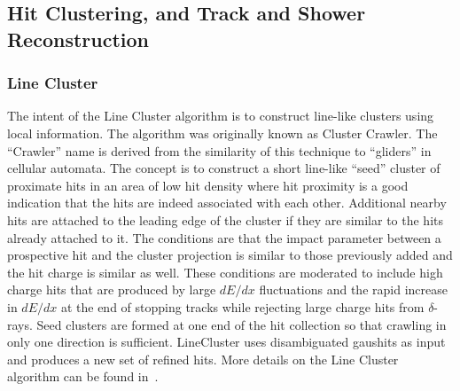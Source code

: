 
\subsection{Hit Clustering, and Track and Shower Reconstruction}

\subsubsection{Line Cluster}\label{sec:LineCluster}
The intent of the Line Cluster algorithm is to construct \twod line-like clusters using local information. The algorithm was originally known as Cluster Crawler. The ``Crawler'' name is derived from the similarity of this technique to ``gliders'' in \twod cellular automata. The concept is to construct a short line-like ``seed'' cluster of proximate hits in an area of low hit density where hit proximity is a good indication that the hits are indeed associated with each other. Additional nearby hits are attached to the leading edge of the cluster if they are similar to the hits already attached to it. The conditions are that the impact parameter between a prospective hit and the cluster projection is similar to those previously added and the hit charge is similar as well. These conditions are moderated to include high charge hits that are produced by large $dE/dx$ fluctuations and the rapid increase in $dE/dx$ at the end of stopping tracks while rejecting large charge hits from $\delta$-rays.
Seed clusters are formed at one end of the hit collection so that crawling in only one direction is sufficient. LineCluster uses disambiguated gaushits as input and produces a new set of refined hits. More details on the Line Cluster algorithm can be found in~\cite{ref:linecluster}.

